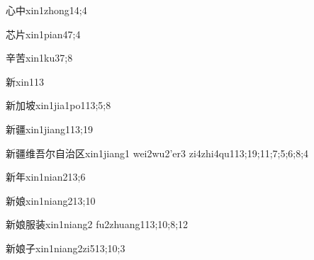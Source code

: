 \begin{verbete}{心中}{xin1zhong1}{4;4}
\end{verbete}

\begin{verbete}{芯片}{xin1pian4}{7;4}
\end{verbete}

\begin{verbete}{辛苦}{xin1ku3}{7;8}
\end{verbete}

\begin{verbete}{新}{xin1}{13}
\end{verbete}

\begin{verbete}{新加坡}{xin1jia1po1}{13;5;8}
\end{verbete}

\begin{verbete}{新疆}{xin1jiang1}{13;19}
\end{verbete}

\begin{verbete}{新疆维吾尔自治区}{xin1jiang1 wei2wu2'er3 zi4zhi4qu1}{13;19;11;7;5;6;8;4}
\end{verbete}

\begin{verbete}{新年}{xin1nian2}{13;6}
\end{verbete}

\begin{verbete}{新娘}{xin1niang2}{13;10}
\end{verbete}

\begin{verbete}{新娘服装}{xin1niang2 fu2zhuang1}{13;10;8;12}
\end{verbete}

\begin{verbete}{新娘子}{xin1niang2zi5}{13;10;3}
\end{verbete}

